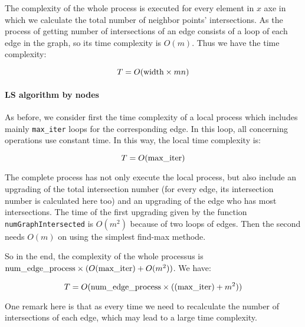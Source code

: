The complexity of the whole process is executed for every element in $x$ axe in which we calculate the total number of neighbor points' intersections. As the process of getting number of intersections of an edge consists of a loop of each edge in the graph, so its time complexity is  $O(m)$. Thus we have the time complexity: 




$$ T = O(\lstinline{width}\times mn)$$

\paragraph{LS algorithm by nodes}

As before, we consider first the time complexity of a local process which includes mainly \lstinline{max_iter} loops for the corresponding edge. In this loop, all concerning operations use constant time. In this way, the local time complexity is:

$$T = O(\lstinline{max_iter})$$

The complete process has not only execute the local process, but also include  an upgrading of the total intersection number (for every edge, its intersection number is calculated here too) and an upgrading of the edge who has most intersections. The time of the first upgrading given by the function \lstinline{numGraphIntersected} is $O(m^2)$ because of two loops of edges. Then the second needs $O(m)$ on using the simplest find-max methode.

So in the end, the complexity of the whole processus is $\lstinline{num_edge_process} \times (O(\lstinline{max_iter})+O(m^2))$. We have:




$$T = O(\lstinline{num_edge_process} \times((\lstinline{max_iter})+m^2))$$

One remark here is that as every time we need to recalculate the number of intersections of each edge, which may lead to a large time complexity.

